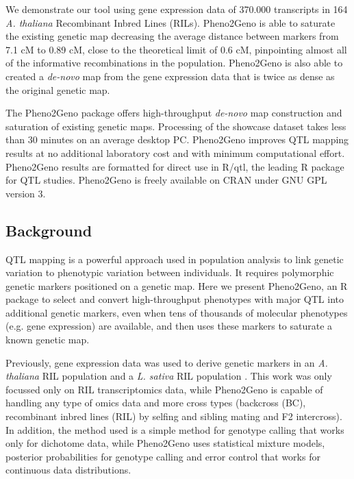 We demonstrate our tool using gene expression data of 370.000 transcripts in 164 \emph{A. thaliana} 
Recombinant Inbred Lines (RILs). Pheno2Geno is able to saturate the existing genetic map decreasing 
the average distance between markers from 7.1 cM to 0.89 cM, close to the theoretical limit of 0.6 cM, 
pinpointing almost all of the informative recombinations in the population. Pheno2Geno is also able 
to created a \emph{de-novo} map from the gene expression data that is twice as dense as the original 
genetic map.

The Pheno2Geno package offers high-throughput \emph{de-novo} map construction and saturation of 
existing genetic maps. Processing of the showcase dataset takes less than 30 minutes on an average 
desktop PC. Pheno2Geno improves QTL mapping results at no additional laboratory cost and with 
minimum computational effort. Pheno2Geno results are formatted for direct use in R/qtl, the leading 
R package for QTL studies. Pheno2Geno is freely available on CRAN under GNU GPL version 3.

\subsection{Background}
QTL mapping \cite{Lander:1989} is a powerful approach used in population analysis to link genetic 
variation to phenotypic variation between individuals. It requires polymorphic genetic markers 
positioned on a genetic map. Here we present Pheno2Geno, an R package to select and convert 
high-throughput phenotypes with major QTL into additional genetic markers, even when tens of 
thousands of molecular phenotypes (e.g. gene expression) are available, and then uses these markers 
to saturate a known genetic map.

Previously, gene expression data was used to derive genetic markers in an \emph{A. thaliana} RIL 
population \cite{West:2006} and a \emph{L. sativa} RIL population \cite{Truco:2013}. This work was 
only focussed only on RIL transcriptomics data, while Pheno2Geno is capable of handling any type 
of omics data and more cross types (backcross (BC), recombinant inbred lines (RIL) by selfing and 
sibling mating and F2 intercross). In addition, the method used \cite{West:2006, Truco:2013} is a 
simple method for genotype calling that works only for dichotome data, while Pheno2Geno uses 
statistical mixture models, posterior probabilities for genotype calling and error control that 
works for continuous data distributions\cite{Jansen:1993, Jansen:2001b}. 

